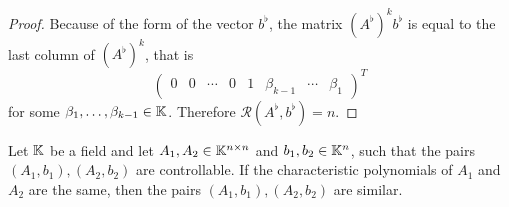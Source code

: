 \begin{proof}
    Because of the form of the vector $b^\flat$, the matrix $(A^\flat)^kb^\flat$ is equal to the last column of $(A^\flat)^k$, that is
    \begin{equation*}
        \begin{pmatrix}
            0 &
            0 &
            \cdots &
            0 &
            1 &
            \beta_{k-1} &
            \cdots &
            \beta_1
        \end{pmatrix}^T
    \end{equation*}
    for some $\beta_1,\ldots,\beta_{k-1}\in\mathbb{K}$. Therefore $\mathcal{R}(A^\flat,b^\flat)=n$.
\end{proof}

\begin{lemma}
\label{lem:simCont}
    Let $\mathbb{K}$ be a field and let $A_1,A_2\in\mathbb{K}^{n\times n}$ and $b_1,b_2\in\mathbb{K}^n$, such that the pairs $(A_1,b_1),(A_2,b_2)$ are controllable. If the characteristic polynomials of $A_1$ and $A_2$ are the same, then the pairs $(A_1,b_1),(A_2,b_2)$ are similar.
\end{lemma}

